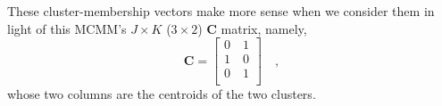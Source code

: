 {These cluster-membership vectors make more sense when we consider them in light of this 
MCMM's $J \times K$ ($3 \times 2$) $\textbf{C}$ matrix, namely, %
\begin{equation*}
        \textbf{C}  = \begin{bmatrix}
          0 \quad 1 \\
           1 \quad 0 \\
           0 \quad 1 \\
         \end{bmatrix} \hspace{12pt},
 \end{equation*}
whose two columns are the centroids of the two clusters. %
}
